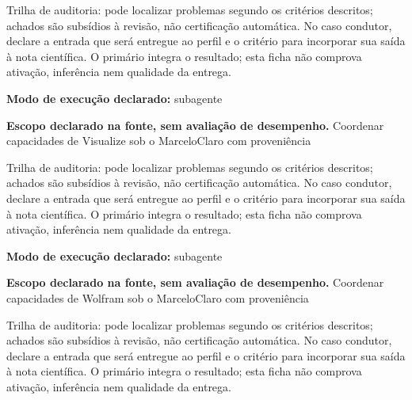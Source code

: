 \begin{funcao}
Trilha de auditoria: pode localizar problemas segundo os critérios descritos; achados são subsídios à revisão, não certificação automática. No caso condutor, declare a entrada que será entregue ao perfil e o critério para incorporar sua saída à nota científica. O primário integra o resultado; esta ficha não comprova ativação, inferência nem qualidade da entrega.
\end{funcao}

\begin{arquitetura}
\textbf{Modo de execução declarado:} subagente
\end{arquitetura}


\begin{descricao}
\textbf{Escopo declarado na fonte, sem avaliação de desempenho.}
Coordenar capacidades de Visualize sob o MarceloClaro com proveniência
\end{descricao}

\begin{funcao}
Trilha de auditoria: pode localizar problemas segundo os critérios descritos; achados são subsídios à revisão, não certificação automática. No caso condutor, declare a entrada que será entregue ao perfil e o critério para incorporar sua saída à nota científica. O primário integra o resultado; esta ficha não comprova ativação, inferência nem qualidade da entrega.
\end{funcao}

\begin{arquitetura}
\textbf{Modo de execução declarado:} subagente
\end{arquitetura}


\begin{descricao}
\textbf{Escopo declarado na fonte, sem avaliação de desempenho.}
Coordenar capacidades de Wolfram sob o MarceloClaro com proveniência
\end{descricao}

\begin{funcao}
Trilha de auditoria: pode localizar problemas segundo os critérios descritos; achados são subsídios à revisão, não certificação automática. No caso condutor, declare a entrada que será entregue ao perfil e o critério para incorporar sua saída à nota científica. O primário integra o resultado; esta ficha não comprova ativação, inferência nem qualidade da entrega.
\end{funcao}

